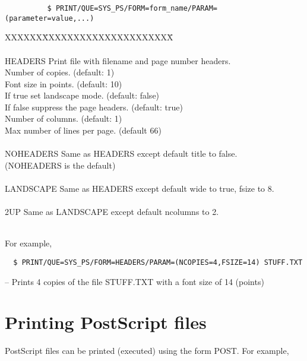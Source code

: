 \begin{verbatim}
          $ PRINT/QUE=SYS_PS/FORM=form_name/PARAM=(parameter=value,...)
\end{verbatim}
\begin{tabbing}
XXXXXX\=XXXXXXXXXXXXXXXXXXXXX\= \kill
{}            \\
\\
\>HEADERS   \>Print file with filename and page number headers.\\
            \>   Number of copies. (default: 1)\\
            \>   Font size in points. (default: 10)\\
            \>   If true set landscape mode. (default: false)\\
            \>   If false suppress the page headers. (default:
true)\\
            \>  Number of columns. (default: 1)\\
            \> Max number of lines per page. (default 66)\\
\\
\>NOHEADERS \>  Same as HEADERS except default title to false.\\
            \>\>(NOHEADERS is the default)\\
\\
\>LANDSCAPE \>  Same as HEADERS except default wide to true, fsize to 8.\\
\\
\>2UP       \>  Same as LANDSCAPE except default ncolumns to 2.\\
\\
\end{tabbing}

For example,

\begin{verbatim}
  $ PRINT/QUE=SYS_PS/FORM=HEADERS/PARAM=(NCOPIES=4,FSIZE=14) STUFF.TXT
\end{verbatim}
-- Prints 4 copies of the file STUFF.TXT with a font size of 14 (points)

\section{Printing PostScript files}

PostScript files can be printed (executed) using the form POST. For example,

